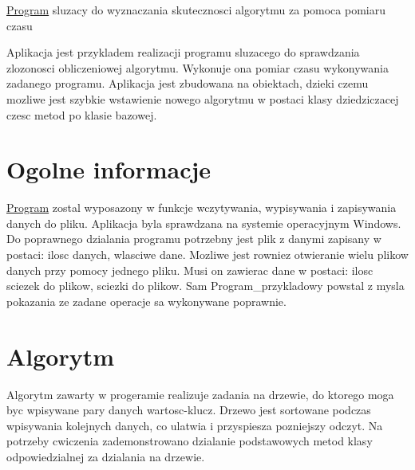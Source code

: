 \hyperlink{class_program}{Program} sluzacy do wyznaczania skutecznosci algorytmu za pomoca pomiaru czasu

Aplikacja jest przykladem realizacji programu sluzacego do sprawdzania zlozonosci obliczeniowej algorytmu. Wykonuje ona pomiar czasu wykonywania zadanego programu. Aplikacja jest zbudowana na obiektach, dzieki czemu mozliwe jest szybkie wstawienie nowego algorytmu w postaci klasy dziedziczacej czesc metod po klasie bazowej.\hypertarget{index_etykieta-ogolne-informacje}{}\section{Ogolne informacje}\label{index_etykieta-ogolne-informacje}
\hyperlink{class_program}{Program} zostal wyposazony w funkcje wczytywania, wypisywania i zapisywania danych do pliku. Aplikacja byla sprawdzana na systemie operacyjnym Windows. Do poprawnego dzialania programu potrzebny jest plik z danymi zapisany w postaci\+: ilosc danych, wlasciwe dane. Mozliwe jest rowniez otwieranie wielu plikow danych przy pomocy jednego pliku. Musi on zawierac dane w postaci\+: ilosc sciezek do plikow, sciezki do plikow. Sam Program\+\_\+przykladowy powstal z mysla pokazania ze zadane operacje sa wykonywane poprawnie.\hypertarget{index_etykieta-algortym}{}\section{Algorytm}\label{index_etykieta-algortym}
Algorytm zawarty w progeramie realizuje zadania na drzewie, do ktorego moga byc wpisywane pary danych wartosc-\/klucz. Drzewo jest sortowane podczas wpisywania kolejnych danych, co ulatwia i przyspiesza pozniejszy odczyt. Na potrzeby cwiczenia zademonstrowano dzialanie podstawowych metod klasy odpowiedzialnej za dzialania na drzewie. 